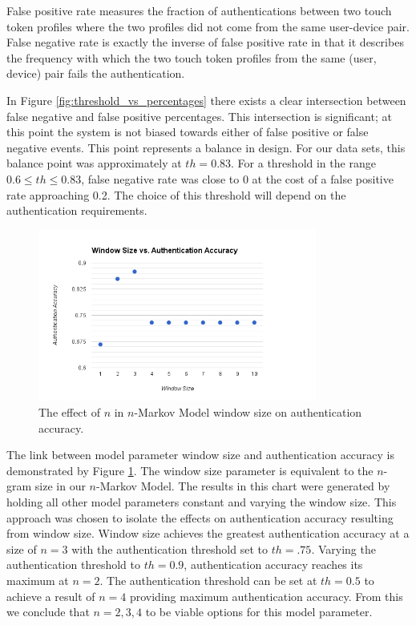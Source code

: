 \documentclass{acm_proc_article-sp}
\begin{document}

False positive rate measures the fraction of authentications between two touch token profiles where 
the two profiles did not come from the same user-device pair.
False negative rate is exactly the inverse of false positive rate in that it describes the
frequency with which the two touch token profiles from the same (user, device) pair fails the authentication. 

In Figure \ref{fig:threshold_vs_percentages} there exists a clear intersection between false negative and false positive percentages. This intersection is significant; at this point the system is not biased towards
either of false positive or false negative events. This point represents a balance in design. For our
data sets, this balance point was approximately at $th=0.83$. For a threshold in the range
$0.6 \leq th \leq 0.83$, false negative rate was close to 0 at the cost of a false positive rate approaching 0.2.
The choice of this threshold will depend on the authentication requirements.

\begin{figure}
\centering
\includegraphics[width=3.6in]{window_size_vs_authentication_accuracy.png}
\caption{The effect of $n$ in $n$-Markov Model window size on authentication accuracy.}
\label{fig:window_size_vs_authentication_accuracy}
\end{figure}

The link between model parameter window size and authentication accuracy is demonstrated by Figure \ref{fig:window_size_vs_authentication_accuracy}.
The window size parameter is equivalent to the $n$-gram size in our $n$-Markov Model.
The results in this chart were generated by holding all other model parameters constant and varying the window size. This approach was chosen to isolate the effects on authentication accuracy resulting from window size.
Window size achieves the greatest authentication accuracy at a size of $n=3$ with the authentication threshold set to $th=.75$.
Varying the authentication threshold to $th=0.9$, authentication accuracy reaches its maximum at $n=2$. 
The authentication threshold can be set at $th=0.5$ to achieve a result of $n=4$ providing maximum authentication accuracy.
From this we conclude that $n={2,3,4}$ to be viable options for this model parameter.
\end{document}
